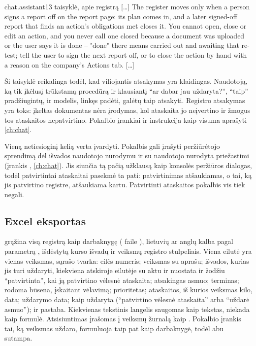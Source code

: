 \begin{promptexcerpt}{chat.assistant}{13 taisyklė, apie registrą}
[…]
The register moves only when a person signs a report off on the report page: its plan comes in, and a later signed-off report that finds an action's obligations met closes it. You cannot open, close or edit an action, and you never call one closed because a document was uploaded or the user says it is done – "done" there means carried out and awaiting that re-test; tell the user to sign the next report off, or to close the action by hand with a reason on the company's Actions tab.
[…]
\end{promptexcerpt}

Ši taisyklė reikalinga todėl, kad viliojantis atsakymas yra klaidingas. Naudotoją, ką tik įkėlusį
trūkstamą procedūrą ir klausiantį \enquote{ar dabar jau uždaryta?}, \enquote{taip} pradžiugintų, ir
modelis, linkęs padėti, galėtų taip atsakyti. Registro atsakymas yra toks: įkeltas dokumentas
nėra įrodymas, kol ataskaita jo neįvertino ir žmogus tos ataskaitos nepatvirtino. Pokalbio
įrankiai ir instrukcija kaip visuma aprašyti \cref{ch:chat}.

Vieną netiesioginį kelią verta įvardyti. Pokalbis gali įrašyti peržiūrėtojo sprendimą dėl
išvados naudotojo nurodymu ir su naudotojo nurodyta priežastimi (įrankis ,
\cref{ch:chat}). Jis siunčia tą pačią užklausą kaip konsolės peržiūros dialogas, todėl
patvirtintai ataskaitai pasekmė ta pati: patvirtinimas atšaukiamas, o tai, ką jis patvirtino
registre, atšaukiama kartu. Patvirtinti ataskaitos pokalbis vis tiek negali.

\subsection{Excel eksportas}

 grąžina visą registrą kaip darbaknygę
( faile ), lietuvių ar anglų kalba pagal
parametrą , išdėstytą kurso išvadų ir veiksmų registro stulpeliais. Viena eilutė
yra vienas veiksmas, sąrašo tvarka: eilės numeris; veiksmas su aprašu; išvados, kurias jis turi
uždaryti, kiekviena atskiroje eilutėje su aktu ir nuostata ir žodžiu \enquote{patvirtinta}, kai
ją patvirtino vėlesnė ataskaita; atsakingas asmuo; terminas; rodoma būsena, įskaitant
vėlavimą; prioritetas; ataskaitos, iš kurios veiksmas kilo, data; uždarymo data; kaip uždaryta
(\enquote{patvirtino vėlesnė ataskaita} arba \enquote{uždarė asmuo}); ir pastaba. Kiekvienas
tekstinis langelis saugomas kaip tekstas, niekada kaip formulė. Atsisiuntimas įrašomas į veiksmų
žurnalą kaip . Pokalbio įrankis tai, ką veiksmas uždaro, formuluoja taip pat
kaip darbaknygė, todėl abu sutampa.


